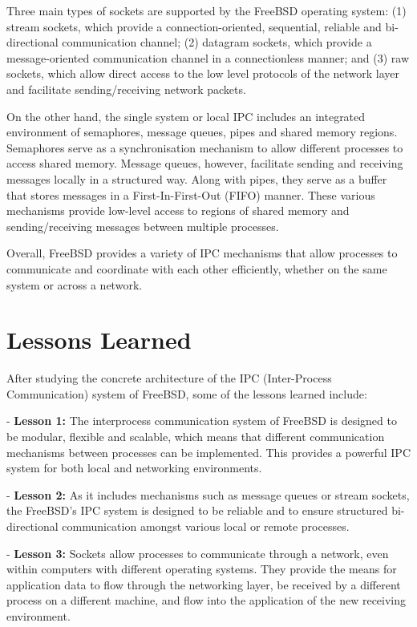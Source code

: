 \documentclass[12pt, dvipsnames, a4paper]{article}
\begin{document}
Three main types of sockets are supported by the FreeBSD operating system: (1) stream sockets, which provide a connection-oriented, sequential, reliable and bi-directional communication channel; (2) datagram sockets, which provide a message-oriented communication channel in a connectionless manner; and (3) raw sockets, which allow direct access to the low level protocols of the network layer and facilitate sending/receiving network packets.

On the other hand, the single system or local IPC includes an integrated environment of semaphores, message queues, pipes and shared memory regions. Semaphores serve as a synchronisation mechanism to allow different processes to access shared memory. Message queues, however, facilitate sending and receiving messages locally in a structured way. Along with pipes, they serve as a buffer that stores messages in a First-In-First-Out (FIFO) manner. These various mechanisms provide low-level access to regions of shared memory and sending/receiving messages between multiple processes.

Overall, FreeBSD provides a variety of IPC mechanisms that allow processes to communicate and coordinate with each other efficiently, whether on the same system or across a network.

\section{Lessons Learned}
After studying the concrete architecture of the IPC (Inter-Process Communication) system of FreeBSD, some of the lessons learned include:

- \textbf{Lesson 1:} The interprocess communication system of FreeBSD is designed to be modular, flexible and scalable, which means that different communication mechanisms between processes can be implemented. This provides a powerful IPC system  for both local and networking environments.

- \textbf{Lesson 2:} As it includes mechanisms such as message queues or stream sockets, the FreeBSD’s IPC system is designed to be reliable and to ensure structured bi-directional communication amongst various local or remote processes.

- \textbf{Lesson 3:} Sockets allow processes to communicate through a network, even within computers with different operating systems. They provide the means for application data to flow through the networking layer, be received by a different process on a different machine, and flow into the application of the new receiving environment.
\end{document}
